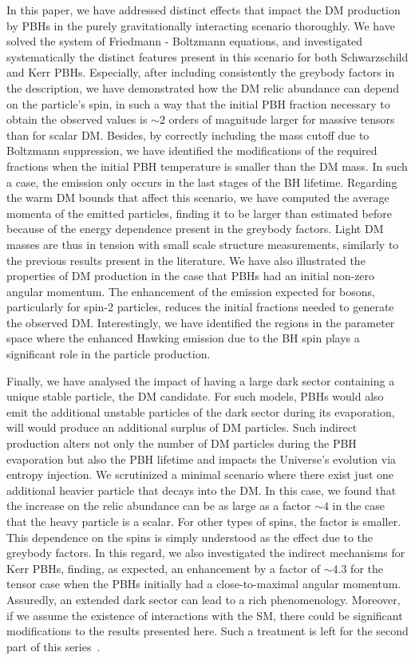 \documentclass[aps,prd,reprint,twocolumn,preprintnumbers,floatfix,nofootinbib]{revtex4-1}
\begin{document}
In this paper, we have addressed distinct effects that impact the DM production by PBHs in the purely gravitationally interacting scenario thoroughly. We have solved the system of Friedmann - Boltzmann equations, and investigated systematically the distinct features present in this scenario for both Schwarzschild and Kerr PBHs.  Especially, after including consistently the greybody factors in the description, we have demonstrated how the DM relic abundance can depend on the particle's spin, in such a way that the initial PBH fraction necessary to obtain the observed values is $\sim 2$ orders of magnitude larger for massive tensors than for scalar DM. Besides, by correctly including the mass cutoff due to Boltzmann suppression, we have identified the modifications of the required fractions when the initial PBH temperature is smaller than the DM mass. In such a case, the emission only occurs in the last stages of the BH lifetime. Regarding the warm DM bounds that affect this scenario, we have computed the average momenta of the emitted particles, finding it to be larger than estimated before because of the energy dependence present in the greybody factors. Light DM masses are thus in tension with small scale structure measurements, similarly to the previous results present in the literature. We have also illustrated the properties of DM production in the case that PBHs had an initial non-zero angular momentum. The enhancement of the emission expected for bosons, particularly for spin-2 particles, reduces the initial fractions needed to generate the observed DM. Interestingly, we have identified the regions in the parameter space where the enhanced Hawking emission due to the BH spin plays a significant role in the particle production. 

Finally, we have analysed the impact of having a large dark sector containing a unique stable particle, the DM candidate. For such models, PBHs would also emit the additional unstable particles of the dark sector during its evaporation, will would produce an additional surplus of DM particles. Such indirect production alters not only the number of DM particles during the PBH evaporation but also the PBH lifetime and impacts the Universe's evolution via entropy injection. We scrutinized a minimal scenario where there exist just one additional heavier particle that decays into the DM. In this case, we found that the increase on the relic abundance can be as large as a factor $\sim 4$ in the case that the heavy particle is a scalar. For other types of spins, the factor is smaller. This dependence on the spins is simply understood as the effect due to the greybody factors. In this regard, we also investigated the indirect mechanisms for Kerr PBHs, finding, as expected, an enhancement by a factor of $\sim 4.3$ for the tensor case when the PBHs initially had a close-to-maximal angular momentum. Assuredly, an extended dark sector can lead to a rich phenomenology. Moreover, if we assume the existence of interactions with the SM, there could be significant modifications to the results presented here. Such a treatment is left for the second part of this series~\cite{paperB}.
\end{document}
